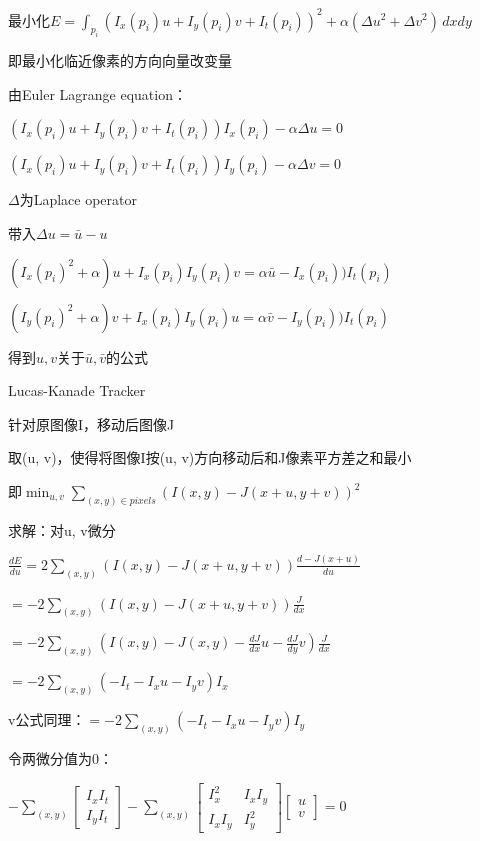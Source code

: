\documentclass[UTF8]{ctexart}
\begin{document}
  \quad 最小化$E = \int_{p_i} (I_x(p_i)u + I_y(p_i)v + I_t(p_i))^2 + \alpha (\Delta u^2 + \Delta v^2) \,dxdy $

  \quad \quad 即最小化临近像素的方向向量改变量

  \quad 由Euler Lagrange equation：

  \quad \quad $(I_x(p_i)u + I_y(p_i)v + I_t(p_i))I_x(p_i) - \alpha\Delta u = 0$
  
  \quad \quad $(I_x(p_i)u + I_y(p_i)v + I_t(p_i))I_y(p_i) - \alpha\Delta v = 0$
 
  \quad \quad \quad $\Delta$为Laplace operator

  \quad 带入$\Delta u = \bar{u} - u$

  \quad \quad $(I_x(p_i)^2 + \alpha)u + I_x(p_i)I_y(p_i)v = \alpha \bar{u} - I_x(p_i))I_t(p_i)$
  
  \quad \quad $(I_y(p_i)^2 + \alpha)v + I_x(p_i)I_y(p_i)u = \alpha \bar{v} - I_y(p_i))I_t(p_i)$

  \quad 得到$u, v$关于$\bar{u}, \bar{v}$的公式

  Lucas-Kanade Tracker

  \quad 针对原图像I，移动后图像J

  \quad 取(u, v)，使得将图像I按(u, v)方向移动后和J像素平方差之和最小

  \quad \quad 即$\min_{u, v}\sum_{(x, y) \in pixels}(I(x, y) - J(x + u, y + v))^2$

  \quad 求解：对u, v微分

  \quad \quad $\frac{dE}{du} = 2\sum_{(x, y)}(I(x, y) - J(x + u, y  + v))\frac{d-J(x + u)}{du}$

  \quad \quad \quad $ = -2\sum_{(x, y)}(I(x, y) - J(x + u, y  + v))\frac{J}{dx}$

  \quad \quad \quad $ = -2\sum_{(x, y)}(I(x, y) - J(x, y) - \frac{dJ}{dx}u - \frac{dJ}{dy}v)\frac{J}{dx}$

  \quad \quad \quad $ = -2\sum_{(x, y)}(-I_t - I_xu - I_yv)I_x$

  \quad \quad \quad v公式同理：$ = -2\sum_{(x, y)}(-I_t - I_xu - I_yv)I_y$

  \quad \quad 令两微分值为0：

  \quad \quad \quad $-\sum_{(x, y)}
    \begin{bmatrix}
      I_xI_t \\
      I_yI_t
      \end{bmatrix} - \sum_{(x, y)}
    \begin{bmatrix}
      I_x^2 & I_xI_y \\
      I_xI_y & I_y^2
      \end{bmatrix}
    \begin{bmatrix}
      u \\
      v
      \end{bmatrix}
    = 0$
\end{document}

